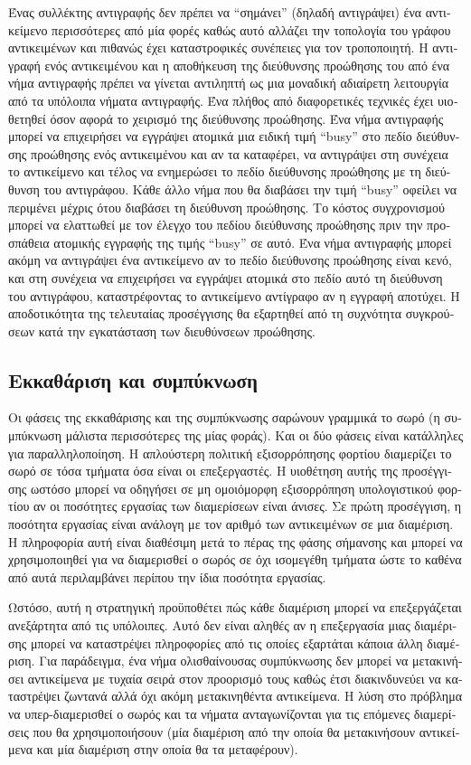 \begin{greek}
Ένας συλλέκτης αντιγραφής δεν πρέπει να ``σημάνει'' (δηλαδή
αντιγράψει) ένα αντικείμενο περισσότερες από μία φορές καθώς
αυτό αλλάζει την τοπολογία του γράφου αντικειμένων και πιθανώς
έχει καταστροφικές συνέπειες για τον τροποποιητή. Η αντιγραφή
ενός αντικειμένου και η αποθήκευση της διεύθυνσης προώθησης
του από ένα νήμα αντιγραφής πρέπει να γίνεται αντιληπτή ως
μια μοναδική αδιαίρετη λειτουργία από τα υπόλοιπα νήματα
αντιγραφής. Ένα πλήθος από διαφορετικές τεχνικές έχει υιοθετηθεί
όσον αφορά το χειρισμό της διεύθυνσης προώθησης. Ένα νήμα
αντιγραφής μπορεί να επιχειρήσει να εγγράψει ατομικά μια ειδική
τιμή ``busy'' στο πεδίο διεύθυνσης προώθησης ενός αντικειμένου
και αν τα καταφέρει, να αντιγράψει στη συνέχεια το αντικείμενο
και τέλος να ενημερώσει το πεδίο διεύθυνσης προώθησης με
τη διεύθυνση του αντιγράφου. Κάθε άλλο νήμα που θα διαβάσει
την τιμή ``busy'' οφείλει να περιμένει μέχρις ότου διαβάσει
τη διεύθυνση προώθησης. Το κόστος συγχρονισμού μπορεί να
ελαττωθεί με τον έλεγχο του πεδίου διεύθυνσης προώθησης
πριν την προσπάθεια ατομικής εγγραφής της τιμής ``busy''
σε αυτό. Ένα νήμα αντιγραφής μπορεί ακόμη να αντιγράψει
ένα αντικείμενο αν το πεδίο διεύθυνσης προώθησης είναι
κενό, και στη συνέχεια να επιχειρήσει να εγγράψει ατομικά
στο πεδίο αυτό τη διεύθυνση του αντιγράφου, καταστρέφοντας
το αντικείμενο αντίγραφο αν η εγγραφή αποτύχει. Η αποδοτικότητα
της τελευταίας προσέγγισης θα εξαρτηθεί από τη συχνότητα
συγκρούσεων κατά την εγκατάσταση των διευθύνσεων προώθησης.

\subsection{Εκκαθάριση και συμπύκνωση}
Οι φάσεις της εκκαθάρισης και της συμπύκνωσης σαρώνουν γραμμικά
το σωρό (η συμπύκνωση μάλιστα περισσότερες της μίας φοράς). Και
οι δύο φάσεις είναι κατάλληλες για παραλληλοποίηση. Η απλούστερη
πολιτική εξισορρόπησης φορτίου διαμερίζει το σωρό σε τόσα τμήματα
όσα είναι οι επεξεργαστές. Η υιοθέτηση αυτής της προσέγγισης
ωστόσο μπορεί να οδηγήσει σε μη ομοιόμορφη εξισορρόπηση υπολογιστικού
φορτίου αν οι ποσότητες εργασίας των διαμερίσεων είναι άνισες.
Σε πρώτη προσέγγιση, η ποσότητα εργασίας είναι ανάλογη με τον
αριθμό των αντικειμένων σε μια διαμέριση. Η πληροφορία αυτή
είναι διαθέσιμη μετά το πέρας της φάσης σήμανσης και μπορεί
να χρησιμοποιηθεί για να διαμερισθεί ο σωρός σε όχι ισομεγέθη
τμήματα ώστε το καθένα από αυτά περιλαμβάνει περίπου την ίδια
ποσότητα εργασίας.

Ωστόσο, αυτή η στρατηγική προϋποθέτει πώς κάθε διαμέριση μπορεί
να επεξεργάζεται ανεξάρτητα από τις υπόλοιπες. Αυτό δεν είναι
αληθές αν η επεξεργασία μιας διαμέρισης μπορεί να καταστρέψει
πληροφορίες από τις οποίες εξαρτάται κάποια άλλη διαμέριση.
Για παράδειγμα, ένα νήμα ολισθαίνουσας συμπύκνωσης δεν μπορεί
να μετακινήσει αντικείμενα με τυχαία σειρά στον προορισμό τους
καθώς έτσι διακινδυνεύει να καταστρέψει ζωντανά αλλά όχι ακόμη
μετακινηθέντα αντικείμενα. Η λύση στο πρόβλημα να υπερ-διαμερισθεί
ο σωρός και τα νήματα ανταγωνίζονται για τις επόμενες διαμερίσεις
που θα χρησιμοποιήσουν (μία διαμέριση από την οποία θα μετακινήσουν
αντικείμενα και μία διαμέριση στην οποία θα τα μεταφέρουν).


\end{greek}
